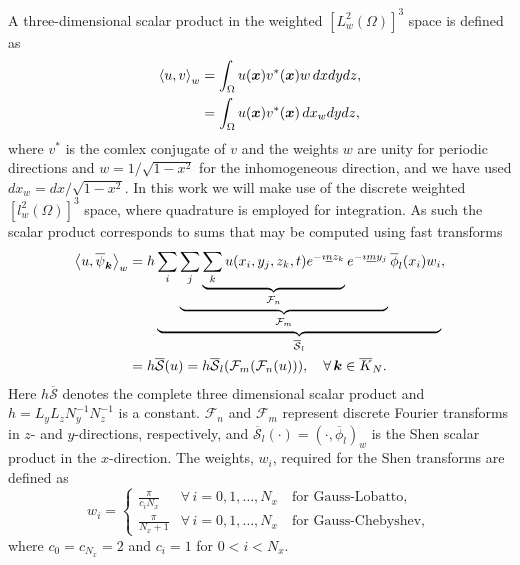 \documentclass[11pt, oneside]{article}
\newcommand{\D}[1]{\overline{#1}}
\begin{document}
A three-dimensional scalar product in the weighted $[L^2_w(\Omega)]^3$ space is defined as
\begin{align}
 \left<u, v\right>_w &= \int_{\Omega} {u(\bm{x}) v^*(\bm{x})}w\,dxdydz, \notag \\
   &= \int_{\Omega} {u(\bm{x}) v^*(\bm{x})}\,dx_wdydz,
\end{align}
where $v^*$ is the comlex conjugate of $v$ and the weights $w$ are unity for periodic directions and  $w=1/\sqrt{1-x^2}$ for the inhomogeneous direction, and we have used $dx_w = dx/\sqrt{1-x^2}$. In this work we will make use of the discrete weighted $[l^2_w(\Omega)]^3$ space, where quadrature is employed for integration. As such the scalar product corresponds to sums that may be computed using fast transforms
\begin{align}
 \left< u, \D{\psi}_{\bm{k}} \right>_w &= h \underbrace{\sum_i \underbrace{\sum_j \underbrace{\sum_k u(x_i, y_j, z_k, t)  e^{-\imath \underline{n} z_k}}_{\mathcal{F}_n}  e^{-\imath \underline{m} y_j} }_{\mathcal{F}_m} \D{\phi}_{l}(x_i) w_i}_{\D{\mathcal{S}}_l},   \notag \\
  &=  h \D{\mathcal{S}}(u) = h \D{\mathcal{S}}_{l} (\mathcal{F}_{{m}} (\mathcal{F}_{{n}}(u))), \quad \forall \, \bm{k} \in \D{K}_N. \label{eq:sst1}
\end{align}
Here $h\D{\mathcal{S}}$ denotes the complete three dimensional scalar product and $h = L_yL_zN_y^{-1}N_z^{-1}$ is a constant. $\mathcal{F}_{{n}}$ and $\mathcal{F}_{{m}}$ represent discrete Fourier transforms in $z$- and $y$-directions, respectively, and $\D{\mathcal{S}}_{l}(\cdot) = (\cdot, \D{\phi}_l)_w$ is the Shen scalar product in the $x$-direction. The weights, $w_i$, required for the Shen transforms are defined as
\begin{equation}
 w_i = \begin{cases}
       \frac{\pi}{c_i N_x} &\forall \, i=0,1,\ldots, N_x \quad  \text{for Gauss-Lobatto},\\
       \frac{\pi}{N_x+1} &\forall \, i=0,1,\ldots, N_x  \quad \text{for Gauss-Chebyshev},      
 \end{cases}
\end{equation}
where $c_0 = c_{N_x} = 2$ and $c_i = 1$ for $0 < i < N_x$.
\end{document}
